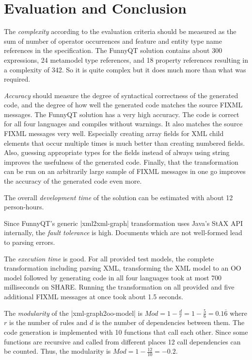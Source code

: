 \documentclass[submission]{eptcs}
\newcommand{\code}{\clojureinline}
\begin{document}
\section{Evaluation and Conclusion}
\label{sec:evaluation}

The \emph{complexity} according to the evaluation criteria should be measured
as the sum of number of operator occurrences and feature and entity type name
references in the specification.  The FunnyQT solution contains about 300
expressions, 24 metamodel type references, and 18 property references resulting
in a complexity of 342.  So it is quite complex but it does much more than what
was required.

\emph{Accuracy} should measure the degree of syntactical correctness of the
generated code, and the degree of how well the generated code matches the
source FIXML messages.  The FunnyQT solution has a very high accuracy.  The
code is correct for all four languages and compiles without warnings.  It also
matches the source FIXML messages very well.  Especially creating array fields
for XML child elements that occur multiple times is much better than creating
numbered fields.  Also, guessing appropriate types for the fields instead of
always using string improves the usefulness of the generated code.  Finally,
that the transformation can be run on an arbitrarily large sample of FIXML
messages in one go improves the accuracy of the generated code even more.

The overall \emph{development time} of the solution can be estimated with about
12 person-hours.

Since FunnyQT's generic \code|xml2xml-graph| transformation uses Java's StAX
API internally, the \emph{fault tolerance} is high.  Documents which are not
well-formed lead to parsing errors.

The \emph{execution time} is good.  For all provided test models, the complete
transformation including parsing XML, transforming the XML model to an OO model
followed by generating code in all four languages took at most 700 milliseconds
on SHARE.  Running the transformation on all provided and five additional FIXML
messages at once took about 1.5 seconds.

The \emph{modularity} of the \code|xml-graph2oo-model| is
\(Mod = 1 - \frac{d}{r} = 1 - \frac{5}{6} = 0.1\overline{6}\)
where \(r\)
is the number of rules and \(d\)
is the number of dependencies between them.  The code generation is implemented
with 10 functions that call each other.  Since some functions are recursive and
called from different places 12 call dependencies can be counted.  Thus, the
modularity is \(Mod = 1 - \frac{12}{10} = -0.2\).
\end{document}
